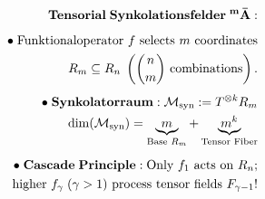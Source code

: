 \documentclass[preview]{standalone}
\begin{document}
\begin{align*}
\special{dvisvgm:raw <g id='unique000'>}\mathbf{Tensorial\;Synkolationsfelder\;{}^m\bar{A}:}\\[5pt]\bullet\;\text{Funktionaloperator }f\text{ selects }m\text{ coordinates}\\\;\;R_m\subseteq R_n\;\left(\binom{n}{m}\text{ combinations}\right).\\[4pt]\bullet\;\mathbf{Synkolatorraum:}\;\mathcal{M}_{\text{syn}} := T^{\otimes k}R_m\\\;\;\dim(\mathcal{M}_{\text{syn}}) = \underbrace{m}_{\text{Base }R_m} + \underbrace{m^k}_{\text{Tensor Fiber}}\\[5pt]\bullet\;\mathbf{Cascade\;Principle:}\;\text{Only }f_1\text{ acts on }R_n;\\\;\;\text{higher }f_\gamma\;(\gamma>1)\text{ process tensor fields }F_{\gamma-1}!\special{dvisvgm:raw </g>}
\end{align*}
\end{document}
